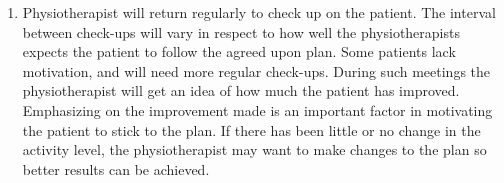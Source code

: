 \begin{enumerate}
  \item Physiotherapist will return regularly to check up on the patient. The interval between check-ups will vary in respect to how well the physiotherapists expects the patient to follow the agreed upon plan. Some patients lack motivation, and will need more regular check-ups. During such meetings the physiotherapist will get an idea of how much the patient has improved. Emphasizing on the improvement made is an important factor in motivating the patient to stick to the plan. If there has been little or no change in the activity level, the physiotherapist may want to make changes to the plan so better results can be achieved.
\end{enumerate}